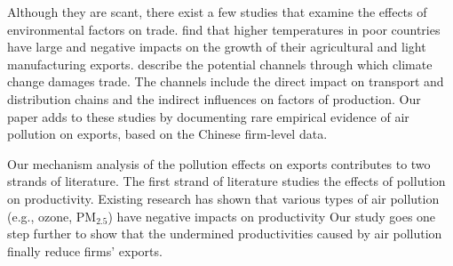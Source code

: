 \documentclass[12pt]{article}
\begin{document}
Although they are scant, there exist a few studies that examine the effects
of environmental factors on trade. \cite{jones2010climate} find that higher
temperatures in poor countries have large and negative impacts on the growth
of their agricultural and light manufacturing exports. \cite%
{dellink2017international} describe the potential channels through which
climate change damages trade. The channels include the direct impact on
transport and distribution chains and the indirect influences on factors of
production. Our paper adds to these studies by documenting rare empirical evidence
of air pollution on exports,
based on the Chinese firm-level data.

Our mechanism analysis of the pollution effects on exports contributes to 
two strands of literature.
The first strand of literature studies the effects of pollution on productivity.
Existing research has shown that various types of air pollution (e.g.,
ozone, $\mathrm{PM_{2.5}}$) have negative impacts on productivity %
\citep{graff2012impact,chang2016particulate,fu2021air,adhvaryu2022management}
Our study goes one step further to show that the undermined productivities caused by air pollution finally 
reduce firms' exports.
\end{document}
